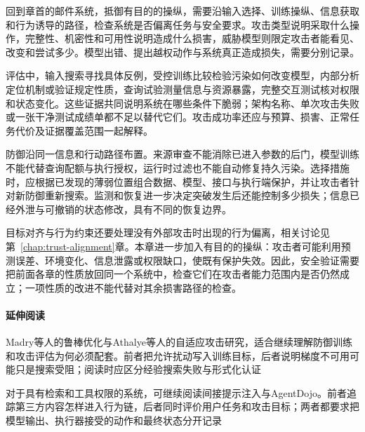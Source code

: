 回到章首的邮件系统，抵御有目的的操纵，需要沿输入选择、训练操纵、信息获取和行为诱导的路径，检查系统是否偏离任务与安全要求。攻击类型说明采取什么操作，完整性、机密性和可用性说明造成什么损害，威胁模型则限定攻击者能看见、改变和尝试多少。模型出错、提出越权动作与系统真正造成损失，需要分别记录。

评估中，输入搜索寻找具体反例，受控训练比较检验污染如何改变模型，内部分析定位机制或验证规定性质，查询试验测量信息与资源暴露，完整交互测试核对权限和状态变化。这些证据共同说明系统在哪些条件下脆弱；架构名称、单次攻击失败或一张干净测试成绩单都不足以替代它们。攻击成功率还应与预算、损害、正常任务代价及证据覆盖范围一起解释。

防御沿同一信息和行动路径布置。来源审查不能消除已进入参数的后门，模型训练不能代替查询配额与执行授权，运行时过滤也不能自动修复持久污染。选择措施时，应根据已发现的薄弱位置组合数据、模型、接口与执行端保护，并让攻击者针对新防御重新搜索。监测和恢复进一步决定突破发生后还能控制多少损失；信息已经外泄与可撤销的状态修改，具有不同的恢复边界。

目标对齐与行为约束还要处理没有外部攻击时出现的行为偏离，相关讨论见第~\ref{chap:trust-alignment}章。本章进一步加入有目的的操纵：攻击者可能利用预测误差、环境变化、信息泄露或权限缺口，使既有保护失效。因此，安全验证需要把前面各章的性质放回同一个系统中，检查它们在攻击者能力范围内是否仍然成立；一项性质的改进不能代替对其余损害路径的检查。

\paragraph{延伸阅读}

Madry等人的鲁棒优化与Athalye等人的自适应攻击研究，适合继续理解防御训练和攻击评估为何必须配套。前者把允许扰动写入训练目标，后者说明梯度不可用可能只是搜索受阻；阅读时应区分经验搜索失败与形式化认证

对于具有检索和工具权限的系统，可继续阅读间接提示注入与AgentDojo。前者追踪第三方内容怎样进入行为链，后者同时评价用户任务和攻击目标；两者都要求把模型输出、执行器接受的动作和最终状态分开记录
